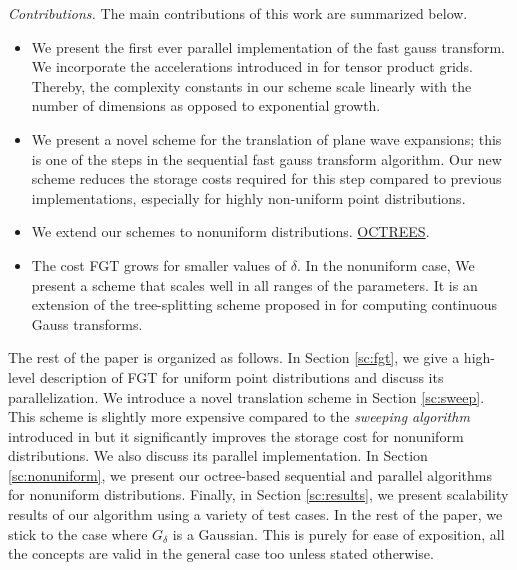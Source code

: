 {\em Contributions.} The main contributions of this work are summarized below.
\begin{itemize} 
%
\item We present the first ever parallel implementation of the fast gauss transform. 
We incorporate the accelerations introduced in \cite{fggt} for tensor product grids. 
Thereby, the complexity constants in our scheme scale linearly with the number of dimensions 
as opposed to exponential growth. 
%
\item We present a novel scheme for the translation of plane wave expansions; this is one
of the steps in the sequential fast gauss transform algorithm. Our new scheme reduces the 
 storage costs required for this step compared to previous implementations, especially for highly
non-uniform point distributions.
%
\item We extend our schemes to nonuniform distributions. \ul{OCTREES}.

\item The cost FGT grows for smaller values of $\delta$. In the nonuniform case, 
We present a scheme that scales well in all ranges of the parameters. It is an extension of the tree-splitting scheme 
proposed in \cite{veerapaneni08} for computing continuous Gauss transforms. 
%
\end{itemize}

The rest of the paper is organized as follows. In Section \ref{sc:fgt}, we give a high-level description of FGT for uniform point distributions and discuss its parallelization. We introduce a novel translation scheme in Section \ref{sc:sweep}. This scheme is slightly more expensive compared to the {\em sweeping algorithm} introduced in \cite{greengard98} but it 
significantly improves the storage cost for nonuniform distributions. We also discuss its parallel implementation. In Section 
\ref{sc:nonuniform}, we present our octree-based sequential and parallel algorithms for nonuniform distributions. Finally, in 
Section \ref{sc:results}, we  present scalability results of our algorithm using a variety of test cases. 
In the rest of the paper, we stick to the case where $G_\delta$ is a Gaussian. This is purely for ease of exposition, all the concepts 
are valid in the general case too unless stated otherwise. 
